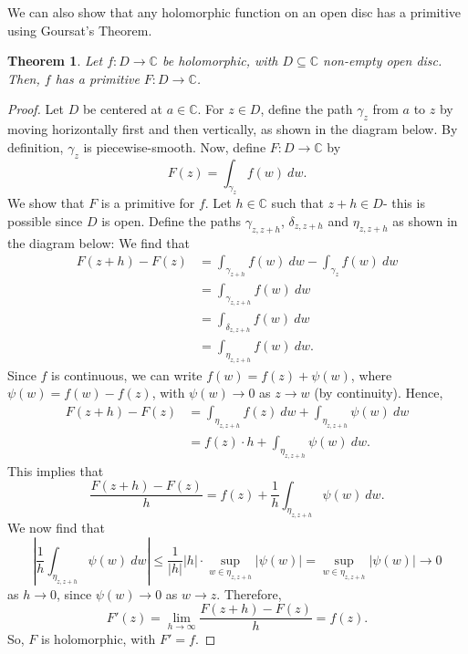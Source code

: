 \documentclass[a4paper, openany]{memoir}
\theoremstyle{definition}
\theoremstyle{plain}
\newtheorem{theorem}[definition]{Theorem}
\begin{document}
    We can also show that any holomorphic function on an open disc has a primitive using Goursat's Theorem.
    \begin{theorem}
        Let $f \colon D \to \mathbb{C}$ be holomorphic, with $D \subseteq \mathbb{C}$ non-empty open disc. Then, $f$ has a primitive $F \colon D \to \mathbb{C}$.
    \end{theorem}
    \begin{proof}
        Let $D$ be centered at $a \in \mathbb{C}$. For $z \in D$, define the path $\gamma_z$ from $a$ to $z$ by moving horizontally first and then vertically, as shown in the diagram below.
        By definition, $\gamma_z$ is piecewise-smooth. Now, define $F \colon D \to \mathbb{C}$ by
        \[F(z) = \int_{\gamma_z} f(w) \ dw.\]
        We show that $F$ is a primitive for $f$. Let $h \in \mathbb{C}$ such that $z + h \in D$- this is possible since $D$ is open. Define the paths $\gamma_{z, z+h}$, $\delta_{z, z+h}$ and $\eta_{z, z+h}$ as shown in the diagram below:
        We find that
        \begin{align*}
            F(z+h) - F(z) &= \int_{\gamma_{z+h}} f(w) \ dw - \int_{\gamma_z} f(w) \ dw \\
            &= \int_{\gamma_{z, z+h}} f(w) \ dw \\
            &= \int_{\delta_{z, z+h}} f(w) \ dw \\
            &= \int_{\eta_{z, z+h}} f(w) \ dw.
        \end{align*}
        Since $f$ is continuous, we can write $f(w) = f(z) + \psi(w)$, where $\psi(w) = f(w) - f(z)$, with $\psi(w) \to 0$ as $z \to w$ (by continuity). Hence,
        \begin{align*}
            F(z+h) - F(z) &= \int_{\eta_{z, z+h}} f(z) \ dw + \int_{\eta_{z, z+h}} \psi(w) \ dw \\
            &= f(z) \cdot h + \int_{\eta_{z, z+h}} \psi(w) \ dw.
        \end{align*}
        This implies that
        \[\frac{F(z+h) - F(z)}{h} = f(z) + \frac{1}{h} \int_{\eta_{z, z+h}} \psi(w) \ dw.\]
        We now find that
        \[\left|\frac{1}{h} \int_{\eta_{z, z+h}} \psi(w) \ dw\right| \leq \frac{1}{|h|} |h| \cdot \sup_{w \in \eta_{z, z+h}} |\psi(w)| = \sup_{w \in \eta_{z, z+h}} |\psi(w)| \to 0\]
        as $h \to 0$, since $\psi(w) \to 0$ as $w \to z$.
        Therefore,
        \[F'(z) = \lim_{h \to \infty} \frac{F(z+h) - F(z)}{h} = f(z).\]
        So, $F$ is holomorphic, with $F' = f$.
    \end{proof}
\end{document}
